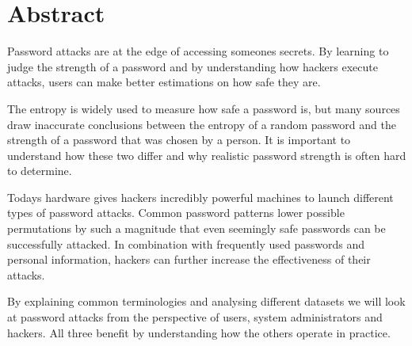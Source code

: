 \section{Abstract}

Password attacks are at the edge of accessing someones secrets. By learning to judge the strength of a password and by understanding how hackers execute attacks, users can make better estimations on how safe they are.

The entropy is widely used to measure how safe a password is, but many sources draw inaccurate conclusions between the entropy of a random password and the strength of a password that was chosen by a person. It is important to understand how these two differ and why realistic password strength is often hard to determine.

Todays hardware gives hackers incredibly powerful machines to launch different types of password attacks. Common password patterns lower possible permutations by such a magnitude that even seemingly safe passwords can be successfully attacked. In combination with frequently used passwords and personal information, hackers can further increase the effectiveness of their attacks.

By explaining common terminologies and analysing different datasets we will look at password attacks from the perspective of users, system administrators and hackers. All three benefit by understanding how the others operate in practice.

\newpage